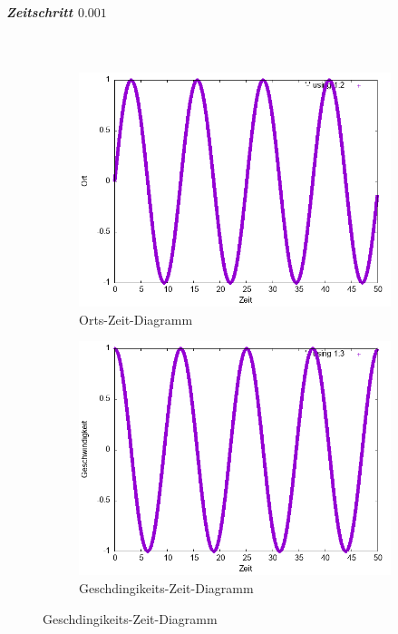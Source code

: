 \documentclass[
    oneside,
    ngerman,
    footinclude=false,
    captions=tableheading,
    DIV=12
]{scrartcl}
\begin{document}
            \subparagraph*{Zeitschritt $0.001$}\,
            \begin{figure}[H]
                \centering
                \begin{subfigure}[b]{0.45\textwidth}
                    \centering
                    \includegraphics[width=\textwidth]{Bilddateien/RK2A1(a)-0001-0-x.png}
                    \caption{Orts-Zeit-Diagramm}
                    \label{fig:RK2A1(a)-0001-0-x}
                \end{subfigure}
                \hfill
                \begin{subfigure}[b]{0.45\textwidth}
                    \centering
                    \includegraphics[width=\textwidth]{Bilddateien/RK2A1(a)-0001-0-v.png}
                    \caption{Geschdingikeits-Zeit-Diagramm}
                    \label{fig:RK2A1(a)-0001-0-v}
                \end{subfigure}
            \end{figure}
        
\end{document}
